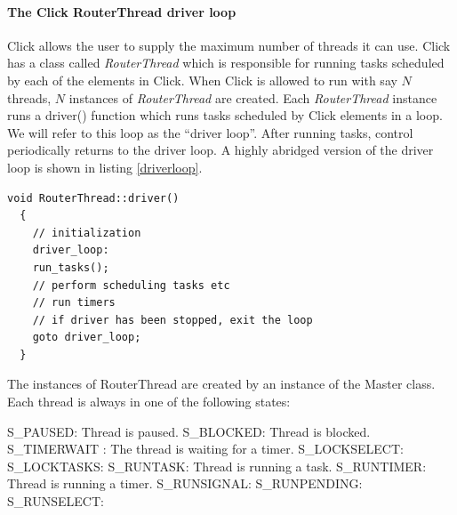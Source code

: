 \documentclass{article}
\begin{document}
\paragraph{The Click RouterThread driver loop}
Click allows the user to supply the maximum number of threads it can use. Click has a class called \emph{RouterThread} which is responsible for running tasks scheduled by each of the elements in Click. When Click is allowed to run with say $N$ threads, $N$ instances of \emph{RouterThread} are created. Each \emph{RouterThread} instance runs a driver() function which runs tasks scheduled by Click elements in a loop. We will refer to this loop as the ``driver loop''. After running tasks, control periodically returns to the driver loop. A highly abridged version of the driver loop is shown in listing \ref{driverloop}.
\begin{lstlisting}[caption = Pseudocode for the driver loop, label=driverloop]
  void RouterThread::driver()
  {
    // initialization 
    driver_loop:
    run_tasks();
    // perform scheduling tasks etc
    // run timers
    // if driver has been stopped, exit the loop
    goto driver_loop;
  }
\end{lstlisting}
The instances of RouterThread are created by an instance of the Master class. Each thread is always in one of the following states:
\begin{code}
S_PAUSED: Thread is paused.
S_BLOCKED: Thread is blocked.
S_TIMERWAIT : The thread is waiting for a timer.
S_LOCKSELECT:
S_LOCKTASKS:
S_RUNTASK: Thread is running a task.
S_RUNTIMER: Thread is running a timer.
S_RUNSIGNAL:
S_RUNPENDING:
S_RUNSELECT:
\end{code}
\end{document}
